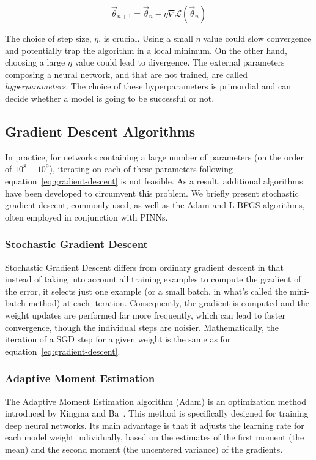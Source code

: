\begin{equation}
\label{eq:gradient-descent}
\Vec{\theta}_{n+1} = \Vec{\theta}_n - \eta \nabla \mathcal{L}(\Vec{\theta}_n)
\end{equation}

The choice of step size, $\eta$, is crucial. Using a small $\eta$ value could slow convergence and potentially trap the algorithm in a local minimum. On the other hand, choosing a large $\eta$ value could lead to divergence. The external parameters composing a neural network, and that are not trained, are called \emph{hyperparameters}. The choice of these hyperparameters is primordial and can decide whether a model is going to be successful or not.

\subsection{Gradient Descent Algorithms}
In practice, for networks containing a large number of parameters (on the order of $10^8-10^9$), iterating on each of these parameters following equation~\eqref{eq:gradient-descent} is not feasible. As a result, additional algorithms have been developed to circumvent this problem. We briefly present stochastic gradient descent, commonly used, as well as the Adam and L-BFGS algorithms, often employed in conjunction with PINNs.

\subsubsection{Stochastic Gradient Descent}
Stochastic Gradient Descent differs from ordinary gradient descent in that instead of taking into account all training examples to compute the gradient of the error, it selects just one example (or a small batch, in what's called the mini-batch method) at each iteration. Consequently, the gradient is computed and the weight updates are performed far more frequently, which can lead to faster convergence, though the individual steps are noisier. Mathematically, the iteration of a SGD step for a given weight is the same as for equation~\eqref{eq:gradient-descent}.

\subsubsection{Adaptive Moment Estimation}
The Adaptive Moment Estimation algorithm (Adam) is an optimization method introduced by Kingma and Ba~\cite{kingma2017adam}. This method is specifically designed for training deep neural networks. Its main advantage is that it adjusts the learning rate for each model weight individually, based on the estimates of the first moment (the mean) and the second moment (the uncentered variance) of the gradients.

